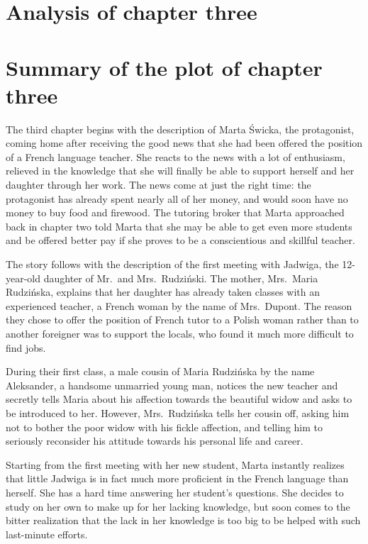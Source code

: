\section{Analysis of chapter three}
\section{Summary of the plot of chapter three}

The third chapter begins with the description of Marta Świcka, the protagonist, coming home after receiving the good news that she had been offered the position of a French language teacher.
She reacts to the news with a lot of enthusiasm, relieved in the knowledge that she will finally be able to support herself and her daughter through her work.
The news come at just the right time: the protagonist has already spent nearly all of her money, and would soon have no money to buy food and firewood.
The tutoring broker that Marta approached back in chapter two told Marta that she may be able to get even more students and be offered better pay if she proves to be a conscientious and skillful teacher.

The story follows with the description of the first meeting with Jadwiga, the 12-year-old daughter of Mr.\ and Mrs.\ Rudziński.
The mother, Mrs.\ Maria Rudzińska, explains that her daughter has already taken classes with an experienced teacher, a French woman by the name of Mrs.\ Dupont.
The reason they chose to offer the position of French tutor to a Polish woman rather than to another foreigner was to support the locals, who found it much more difficult to find jobs.

During their first class, a male cousin of Maria Rudzińska by the name Aleksander, a handsome unmarried young man, notices the new teacher and secretly tells Maria about his affection towards the beautiful widow and asks to be introduced to her.
However, Mrs.\ Rudzińska tells her cousin off, asking him not to bother the poor widow with his fickle affection, and telling him to seriously reconsider his attitude towards his personal life and career.

Starting from the first meeting with her new student, Marta instantly realizes that little Jadwiga is in fact much more proficient in the French language than herself.
She has a hard time answering her student's questions.
She decides to study on her own to make up for her lacking knowledge, but soon comes to the bitter realization that the lack in her knowledge is too big to be helped with such last-minute efforts.

